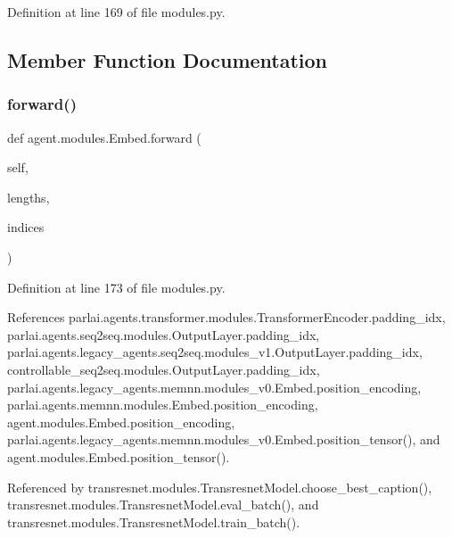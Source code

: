 Definition at line 169 of file modules.\+py.



\subsection{Member Function Documentation}
\mbox{\label{classagent_1_1modules_1_1Embed_aecd5510c339a8fd238d56226863dcb81}} 
\subsubsection{\texorpdfstring{forward()}{forward()}}
{\footnotesize\ttfamily def agent.\+modules.\+Embed.\+forward (\begin{DoxyParamCaption}\item[{}]{self,  }\item[{}]{lengths,  }\item[{}]{indices }\end{DoxyParamCaption})}



Definition at line 173 of file modules.\+py.



References parlai.\+agents.\+transformer.\+modules.\+Transformer\+Encoder.\+padding\+\_\+idx, parlai.\+agents.\+seq2seq.\+modules.\+Output\+Layer.\+padding\+\_\+idx, parlai.\+agents.\+legacy\+\_\+agents.\+seq2seq.\+modules\+\_\+v1.\+Output\+Layer.\+padding\+\_\+idx, controllable\+\_\+seq2seq.\+modules.\+Output\+Layer.\+padding\+\_\+idx, parlai.\+agents.\+legacy\+\_\+agents.\+memnn.\+modules\+\_\+v0.\+Embed.\+position\+\_\+encoding, parlai.\+agents.\+memnn.\+modules.\+Embed.\+position\+\_\+encoding, agent.\+modules.\+Embed.\+position\+\_\+encoding, parlai.\+agents.\+legacy\+\_\+agents.\+memnn.\+modules\+\_\+v0.\+Embed.\+position\+\_\+tensor(), and agent.\+modules.\+Embed.\+position\+\_\+tensor().



Referenced by transresnet.\+modules.\+Transresnet\+Model.\+choose\+\_\+best\+\_\+caption(), transresnet.\+modules.\+Transresnet\+Model.\+eval\+\_\+batch(), and transresnet.\+modules.\+Transresnet\+Model.\+train\+\_\+batch().

